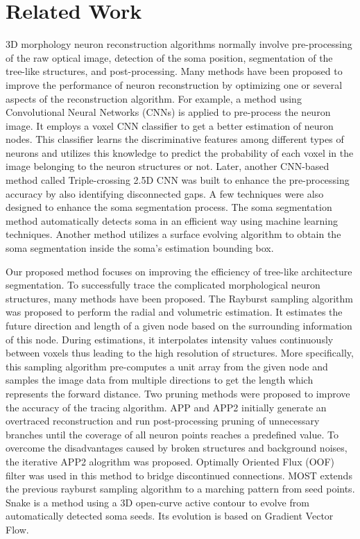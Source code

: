 \documentclass[conference]{IEEEtran}
\begin{document}
\section{Related Work}


3D morphology neuron reconstruction algorithms normally involve pre-processing of the raw optical image, detection of the soma position, segmentation of the tree-like structures, and post-processing. Many methods have been proposed to improve the performance of neuron reconstruction by optimizing one or several aspects of the reconstruction algorithm. For example, a method \cite{li2017deep} using Convolutional Neural Networks (CNNs) is applied to pre-process the neuron image. It employs a voxel CNN classifier to get a better estimation of neuron nodes. This classifier learns the discriminative features among different types of neurons and utilizes this knowledge to predict the probability of each voxel in the image belonging to the neuron structures or not. Later, another CNN-based method called Triple-crossing 2.5D CNN \cite{25dcrossingsiqi} was built to enhance the pre-processing accuracy by also identifying disconnected gaps. A few techniques \cite{He2018, Zhang2018soma} were also designed to enhance the soma segmentation process. The soma segmentation method \cite{He2018} automatically detects soma in an efficient way using machine learning techniques. Another method \cite{Zhang2018soma} utilizes a surface evolving algorithm to obtain the soma segmentation inside the soma's estimation bounding box.
 
Our proposed method focuses on improving the efficiency of tree-like architecture segmentation. To successfully trace the complicated morphological neuron structures, many methods \cite{r1_1, r1_2, r2, app, app2, most, rayburst, fm-basu} have been proposed. The Rayburst sampling algorithm  was proposed to perform the radial and volumetric estimation. It estimates the future direction and length of a given node based on the surrounding information of this node. During estimations, it interpolates intensity values continuously between voxels thus leading to the high resolution of structures. More specifically, this sampling algorithm pre-computes a unit array from the given node and samples the image data from multiple directions to get the length which represents the forward distance. Two pruning methods were proposed to improve the accuracy of the tracing algorithm. APP and APP2 initially generate an overtraced reconstruction and run post-processing pruning of unnecessary branches until the coverage of all neuron points reaches a predefined value. To overcome the disadvantages caused by broken structures and background noises, the iterative APP2 alogrithm \cite{tang2017automatic} was proposed. Optimally Oriented Flux (OOF) filter \cite{oof} was used in this method to bridge discontinued connections. MOST \cite{most} extends the previous rayburst sampling algorithm to a marching pattern from seed points. Snake is a method using a 3D open-curve active contour to evolve from automatically detected soma seeds. Its evolution is based on Gradient Vector Flow. 
\end{document}
